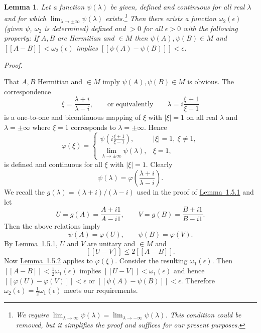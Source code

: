 \documentclass[b5paper,twoside]{article}
\newcommand{\lemref}[2]{\hyperref[#1]{\mbox{Lemma~#2}}}
\theoremstyle{mvnplain}
\newtheorem{lemma}{Lemma}[section]
\renewenvironment{proof}[1][Proof]{%
  \par\addvspace{0.35\baselineskip}%
  \noindent\textit{#1.}\ \normalfont\ignorespaces
}{%
  \par\addvspace{0.35\baselineskip}%
}
\newcommand{\M}{\mathbf M}
\newcommand{\Metric}[1]{\left[\!\left[#1\right]\!\right]}
\def\M{M}%
\def\Metric#1{[[#1]]}%
\begin{document}
\begin{lemma}\label{lem:1.5.3}
Let a function $\psi(\lambda)$ be given, defined and continuous for all real
$\lambda$ and for which $\lim_{\lambda\to\pm\infty}\psi(\lambda)$
exists.\footnote{We require
$\lim_{\lambda\to\infty}\psi(\lambda)=
\lim_{\lambda\to-\infty}\psi(\lambda)$.  This condition could be removed, but
it simplifies the proof and suffices for our present purposes.}  Then there
exists a function $\omega_2(\epsilon)$ (given $\psi$, $\omega_2$ is determined)
defined and $>0$ for all $\epsilon>0$ with the following property: If $A,B$ are
Hermitian and $\in\M$ then $\psi(A),\psi(B)\in\M$ and
$\Metric{A-B}<\omega_2(\epsilon)$ implies
$\Metric{\psi(A)-\psi(B)}<\epsilon$.
\end{lemma}
\begin{proof}
That $A,B$ Hermitian and $\in\M$ imply $\psi(A),\psi(B)\in\M$ is obvious.
The correspondence
\[
  \xi=\frac{\lambda+i}{\lambda-i},
  \qquad\text{or equivalently}\qquad
  \lambda=i\frac{\xi+1}{\xi-1}
\]
is a one-to-one and bicontinuous mapping of $\xi$ with $|\xi|=1$ on all real
$\lambda$ and $\lambda=\pm\infty$ where $\xi=1$ corresponds to
$\lambda=\pm\infty$.  Hence
\[
  \varphi(\xi)=
  \begin{cases}
    \displaystyle\psi\!\left(i\frac{\xi+1}{\xi-1}\right),
      & |\xi|=1,\ \xi\neq1,\\[6pt]
    \displaystyle\lim_{\lambda\to\pm\infty}\psi(\lambda),
      & \xi=1,
  \end{cases}
\]
is defined and continuous for all $\xi$ with $|\xi|=1$.  Clearly
\[
  \psi(\lambda)=\varphi\!\left(\frac{\lambda+i}{\lambda-i}\right).
\]
We recall the $g(\lambda)=(\lambda+i)/(\lambda-i)$ used in the proof of
\lemref{lem:1.5.1}{1.5.1} and let
\[
  U=g(A)=\frac{A+i1}{A-i1},\qquad
  V=g(B)=\frac{B+i1}{B-i1}.
\]
Then the above relations imply
\[
  \psi(A)=\varphi(U),\qquad \psi(B)=\varphi(V).
\]
By \lemref{lem:1.5.1}{1.5.1}, $U$ and $V$ are unitary and $\in\M$ and
\[
  \Metric{U-V}\leq2\Metric{A-B}.
\]
Now \lemref{lem:1.5.2}{1.5.2} applies to $\varphi(\xi)$.  Consider the
resulting $\omega_1(\epsilon)$.  Then
$\Metric{A-B}<\frac12\omega_1(\epsilon)$ implies
$\Metric{U-V}<\omega_1(\epsilon)$ and hence
$\Metric{\varphi(U)-\varphi(V)}<\epsilon$ or
$\Metric{\psi(A)-\psi(B)}<\epsilon$.  Therefore
$\omega_2(\epsilon)=\frac12\omega_1(\epsilon)$ meets our requirements.
\end{proof}
\end{document}
